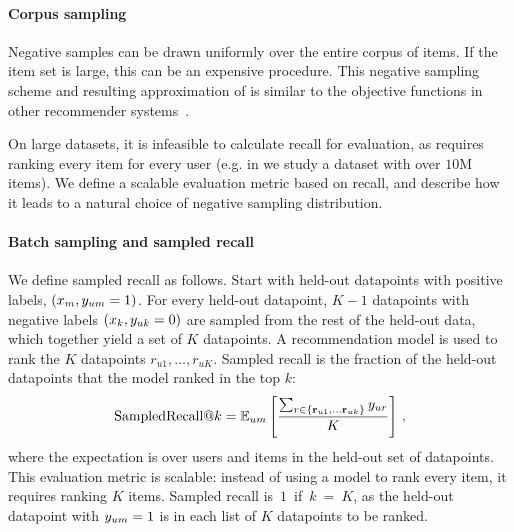 

\paragraph{Corpus sampling} Negative samples can be drawn uniformly over the
entire corpus of items. If the item set is large, this can be an expensive
procedure. This negative sampling scheme and resulting approximation of
 is similar to the objective functions in other recommender
systems~\cite{he2017neural,song2018neural}.

On large datasets, it is infeasible to calculate recall for evaluation, as
 requires ranking every item for every user (e.g. in
 we study a dataset with over $10$M items). We
define a scalable evaluation metric based on recall, and describe how it leads
to a natural choice of negative sampling distribution.

\paragraph{Batch sampling and sampled recall} We define sampled recall as
follows. Start with held-out datapoints with positive labels, $(x_m, y_{um} = 1)$.
For every held-out datapoint, $K-1$ datapoints with negative labels
$(x_k, y_{uk} = 0)$ are sampled from the rest of the held-out data, which together
yield a set of $K$ datapoints. A recommendation model is used to rank the $K$
datapoints $r_{u1}, \ldots, r_{uK}$. Sampled recall is the fraction of the
held-out datapoints that the model ranked in the top $k$:
\begin{equation}
\begin{aligned}
\label{eq:sampled-recall}
  \textrm{Sampled}&\textrm{Recall@}k = \mathbb{E}_{um}\left[\frac{\sum_{r\in \{\boldsymbol{\mathbf{r}}_{u1},
      \ldots \boldsymbol{\mathbf{r}}_{uk}\}} y_{ur}}{K}\right] \, ,\\
\end{aligned}
\end{equation}
where the expectation is over users and items in the held-out set of datapoints.
This evaluation metric is scalable: instead of using a model to rank every item,
it requires ranking $K$ items. Sampled recall is~$1$~if~$k~=~K$, as the held-out
datapoint with $y_{um} = 1$ is in each list of $K$ datapoints to be ranked.

